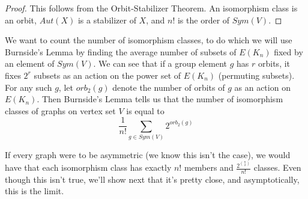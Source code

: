 

\begin{proof}
	This follows from the Orbit-Stabilizer Theorem.  An isomorphism class is an orbit, $Aut(X)$ is a stabilizer of $X$, and $n!$ is the order of $Sym(V)$.
\end{proof}

We want to count the number of isomorphism classes, to do which we will use Burnside's Lemma by finding the average number of subsets of $E(K_n)$ fixed by an element of $Sym(V)$.  We can see that if a group element $g$ has $r$ orbits, it fixes $2^r$ subsets as an action on the power set of $E(K_n)$ (permuting subsets).  For any such $g$, let $orb_2(g)$ denote the number of orbits of $g$ as an action on $E(K_n)$.  Then Burnside's Lemma tells us that the number of isomorphism classes of graphs on vertex set $V$ is equal to $$\frac{1}{n!}\sum\limits_{g\in Sym(V)} 2^{orb_2(g)}$$

If every graph were to be asymmetric (we know this isn't the case), we would have that each isomorphism class has exactly $n!$ members and $\frac{2^{\binom{n}{2}}}{n!}$ classes.  Even though this isn't true, we'll show next that it's pretty close, and asymptotically, this is the limit.


